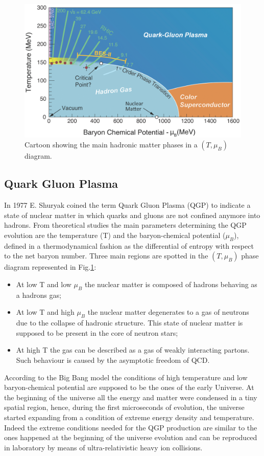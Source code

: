 \begin{figure}[!t]
\begin{center}
\includegraphics[width=0.85\linewidth]{Chapters/Introduction/Figs/QGPPhases.png}
\caption{Cartoon showing the main hadronic matter phases in a $(T,\mu_B)$ diagram.}
\label{fig:QGPPhases}
\end{center}
\end{figure}

\subsection{Quark Gluon Plasma}
In 1977 E. Shuryak coined the term Quark Gluon Plasma (QGP) to indicate a state of nuclear matter in which quarks and gluons are not confined anymore into hadrons.
From theoretical studies the main parameters determining the QGP evolution are the temperature (T) and the baryon-chemical potential ($\mu_B$), defined in a thermodynamical fashion as the differential of entropy with respect to the net baryon number.
Three main regions are spotted in the $(T,\mu_B)$ phase diagram represented in Fig.\ref{fig:QGPPhases}:
\begin{itemize}
    \item At low T and low $\mu_B$ the nuclear matter is composed of hadrons behaving as a hadrons gas;
    \item At low T and high $\mu_B$ the nuclear matter degenerates to a gas of neutrons due to the collapse of hadronic structure. This state of nuclear matter is supposed to be present in the core of neutron stars;
    \item At high T the gas can be described as a gas of weakly interacting partons. Such behaviour is caused by the asymptotic freedom of QCD.
\end{itemize}

According to the Big Bang model the conditions of high temperature and low baryon-chemical potential are supposed to be the ones of the early Universe.
At the beginning of the universe all the energy and matter were condensed in a tiny spatial region, hence, during the first microseconds of evolution, the universe started expanding from a condition of extreme energy density and temperature.
Indeed the extreme conditions needed for the QGP production are similar to the ones happened at the beginning of the universe evolution and can be reproduced in laboratory by means of ultra-relativistic heavy ion collisions.

